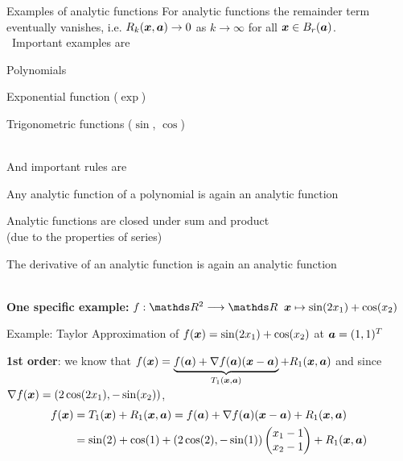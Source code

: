 \documentclass[11pt,compress,t,notes=noshow, xcolor=table]{beamer}
\begin{document}
\begin{framev}{Examples of analytic functions}
For analytic functions the remainder term eventually vanishes, i.e.
$R_k(\bm{x}, \bm{a}) \rightarrow 0$ as $k \rightarrow \infty$ for all $\bm{x} \in B_r(\bm{a})$.\\\,
Important examples are\begin{itemizeM}
\item Polynomials
\item Exponential function ($\exp$)
\item Trigonometric functions ($\sin$, $\cos$)
\end{itemizeM}\,\\
And important rules are \begin{itemizeM}
\item Any analytic function of a polynomial is again an analytic function
\item Analytic functions are closed under sum and product \\(due to the properties of series)
\item The derivative of an analytic function is again an analytic function
\end{itemizeM}\,\\
\textbf{One specific example: } $f:\R^2\longrightarrow \R$ $\bm{x} \mapsto \sin(2x_1) + \cos(x_2)$
\end{framev}


\begin{framev}{Example: Taylor Approximation of $\fx = \sin(2\MakeLowercase{x}_1) + \cos(\MakeLowercase{x}_2)$ at $\bm{\MakeLowercase{a}} = (1, 1)^T$}
\,\\
\begin{footnotesize}
\textbf{1st order}: we know that $f(\bm{x}) = \underbrace{f(\bm{a}) + \nabla f(\bm{a}) (\bm{x} - \bm{a})}_{T_1(\bm{x}, \bm{a})} + R_1(\bm{x},\bm{a})$
and since  $\nabla f(\bm{x}) = \left(2\cos(2x_1), -\sin(x_2)\right)$,
\begin{align*}
f(\bm{x}) &= T_1(\bm{x}) + R_1(\bm{x}, \bm{a}) = f(\bm{a}) + \nabla f(\bm{a}) (\bm{x} - \bm{a}) + R_1(\bm{x}, \bm{a})\\
&= \sin(2) + \cos(1) + (2 \cos(2), - \sin(1))\begin{pmatrix} x_1 - 1 \\ x_2 - 1\end{pmatrix} + R_1(\bm{x}, \bm{a})
\end{align*}
\end{footnotesize}
\vspace*{-0.5\baselineskip}
{}
\end{framev}
\end{document}
